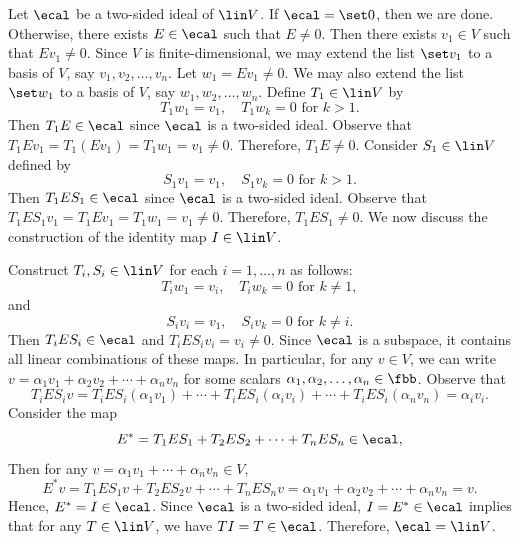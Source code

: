 \begin{sol}
    Let $\ecal$ be a two-sided ideal of $\lin V$.
	If $\ecal = \set 0$, then we are done.
	Otherwise, there exists $E \in \ecal$ such that $E \neq 0$.
	Then there exists $v_1 \in V$ such that $Ev_1 \neq 0$.
	Since $V$ is finite-dimensional, we may extend the list $\set v_1$ to a basis of $V$, say $v_1, v_2, \ldots, v_n$.
	Let $w_1 = Ev_1 \neq 0$.
	We may also extend the list $\set w_1$ to a basis of $V$, say $w_1, w_2, \ldots, w_n$.
	Define $T_1 \in \lin V$ by
    \[
    	T_1w_1 = v_1, \quad T_1w_k = 0 \text{ for } k > 1.
    \]
    Then $T_1E \in \ecal$ since $\ecal$ is a two-sided ideal.
	Observe that $T_1Ev_1 = T_1(Ev_1) = T_1w_1 = v_1 \neq 0$.
	Therefore, $T_1E \neq 0$.
	Consider $S_1 \in \lin V$ defined by
    \[
    	S_1v_1 = v_1, \quad S_1v_k = 0 \text{ for } k > 1.
    \]
    Then $T_1ES_1 \in \ecal$ since $\ecal$ is a two-sided ideal.
	Observe that $T_1ES_1v_1 = T_1Ev_1 = T_1w_1 = v_1 \neq 0$.
	Therefore, $T_1ES_1 \neq 0$.
	We now discuss the construction of the identity map $I \in \lin V$.
    
    Construct $T_i, S_i \in \lin V$ for each $i = 1, \ldots, n$ as follows:
    \[
    	T_i w_1 = v_i, \quad T_i w_k = 0 \text{ for } k \neq 1,
    \]
    and
    \[
    	S_i v_i = v_1, \quad S_i v_k = 0 \text{ for } k \neq i.
    \]
    Then $T_iES_i \in \ecal$ and $T_iES_i v_i = v_i \neq 0$.
	Since $\ecal$ is a subspace, it contains all linear combinations of these maps.
	In particular, for any $v \in V$, we can write $v = \alpha_1 v_1 + \alpha_2 v_2 + \cdots + \alpha_n v_n$ for some scalars $\alpha_1, \alpha_2, \ldots, \alpha_n \in \fbb$.
	Observe that
    \[
    	T_iES_iv = T_iES_i(\alpha_1 v_1) + \cdots + T_iES_i(\alpha_i v_i) + \cdots + T_iES_i(\alpha_n v_n) = \alpha_i v_i.
    \]
    Consider the map
    \[
    	E^* = T_1ES_1 + T_2ES_2 + \cdots + T_nES_n \in \ecal,
    \]
    Then for any $v = \alpha_1 v_1 + \cdots + \alpha_n v_n \in V$,
    \[
    	E^*v = T_1ES_1 v + T_2ES_2 v + \cdots + T_nES_n v = \alpha_1 v_1 + \alpha_2 v_2 + \cdots + \alpha_n v_n = v.
    \]
    Hence, $E^* = I \in \ecal$.
	Since $\ecal$ is a two-sided ideal, $I = E^* \in \ecal$ implies that for any $T \in \lin V$, we have $TI = T \in \ecal$.
	Therefore, $\ecal = \lin V$.
\end{sol}